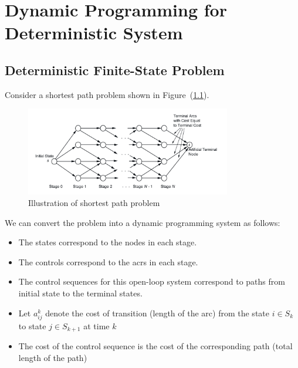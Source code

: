 \chapter{Dynamic Programming for Deterministic System}

\section{Deterministic Finite-State Problem}
%
%
Consider a shortest path problem shown in Figure~(\ref{fig:2:1}).
\begin{figure}
\includegraphics[width = 0.8\textwidth]{Second_lecture/p_1}
\caption{Illustration of shortest path problem}
\label{fig:2:1}
\end{figure}
We can convert the problem into a dynamic programming system as follows:
\begin{itemize}
\item
The states correspond to the nodes in each stage.
\item
The controls correspond to the acrs in each stage.
\item
The control sequences for this open-loop system correspond to paths from initial state to the terminal states.
\item
Let $a_{ij}^k$ denote the cost of transition (length of the arc) from the state $i\in S_k$ to state $j\in S_{k+1}$ at time $k$ 
\item
The cost of the control sequence is the cost of the corresponding path (total length of the path)
\end{itemize}
